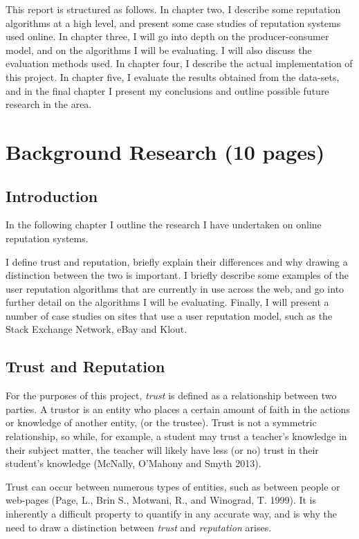 \documentclass[]{final_report}
\begin{document}
This report is structured as follows. In chapter two, I describe some reputation algorithms at a high level, and present some case studies of reputation systems used online. In chapter three, I will go into depth on the producer-consumer model, and on the algorithms I will be evaluating. I will also discuss the evaluation methods used. In chapter four, I describe the actual implementation of this project. In chapter five, I evaluate the results obtained from the data-sets, and in the final chapter I present my conclusions and outline possible future research in the area.



\chapter{Background Research (10 pages)}

\section{Introduction}

In the following chapter I outline the research I have undertaken on online reputation systems.

I define trust and reputation, briefly explain their differences and why drawing a distinction between the two is important. I  briefly describe some examples of the user reputation algorithms that are currently in use across the web, and go into further detail on the algorithms I will be evaluating. Finally,  I will present a number of case studies on sites that use a user reputation model, such as the Stack Exchange Network, eBay and Klout.


\section{Trust and Reputation}

For the purposes of this project, \textsl{trust} is defined as a relationship between two parties. A trustor is an entity who places a certain amount of faith in the actions or knowledge of another entity, (or the trustee). Trust is not a symmetric relationship, so while, for example, a student may trust a teacher's knowledge in their subject matter, the teacher will likely have less (or no) trust in their student's knowledge  (McNally, O'Mahony and Smyth 2013).

Trust can occur between numerous types of entities, such as between people or web-pages (Page, L., Brin S., Motwani, R., and Winograd, T. 1999). It is inherently a difficult property to quantify in any accurate way, and is why the need to draw a distinction between \textsl{trust} and \textsl{reputation} arises.
\end{document}
